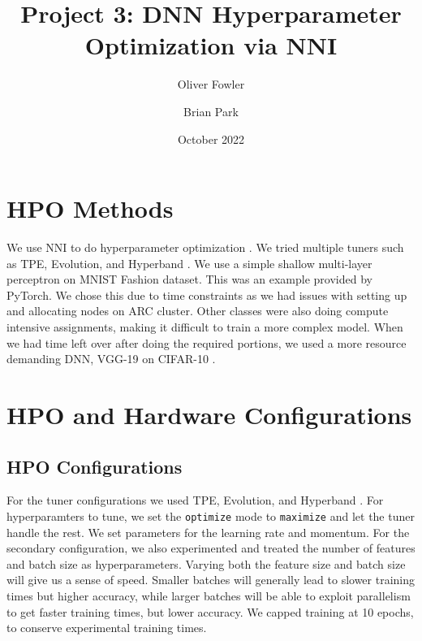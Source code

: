 \documentclass{article}
\title{Project 3: DNN Hyperparameter Optimization via NNI}
\author{Oliver Fowler}
\author{Brian Park}
\affil{North Carolina State University, Computer Science 591/791-025}
\date{October 2022}
\begin{document}
\maketitle




\section{HPO Methods}

We use NNI to do hyperparameter optimization \cite{nni}. We tried multiple tuners such as TPE, Evolution, and Hyperband \cite{tpe, evolution, hyperband}. We use a simple shallow multi-layer perceptron on MNIST Fashion dataset. This was an example provided by PyTorch. We chose this due to time constraints as we had issues with setting up and allocating nodes on ARC cluster. Other classes were also doing compute intensive assignments, making it difficult to train a more complex model. When we had time left over after doing the required portions, we used a more resource demanding DNN, VGG-19 on CIFAR-10 \cite{vgg}.


\section{HPO and Hardware Configurations}

\subsection{HPO Configurations}
For the tuner configurations we used TPE, Evolution, and Hyperband \cite{tpe, evolution, hyperband}. For hyperparamters to tune, we set the \verb|optimize| mode to \verb|maximize| and let the tuner handle the rest. We set parameters for the learning rate and momentum. For the secondary configuration, we also experimented and treated the number of features and batch size as hyperparameters. Varying both the feature size and batch size will give us a sense of speed. Smaller batches will generally lead to slower training times but higher accuracy, while larger batches will be able to exploit parallelism to get faster training times, but lower accuracy. We capped training at 10 epochs, to conserve experimental training times.
\end{document}
